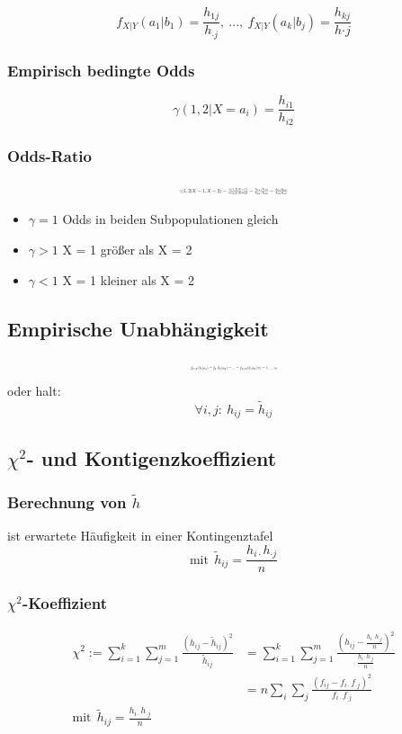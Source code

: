 \documentclass[10pt,a4paper,landscape]{article}
\begin{document}
\begin{multicols}{4}
\[
f_{X|Y}(a_1|b_1)=\frac{h_{1j}}{h_{\cdot j}},~...,~ f_{X|Y}(a_k|b_j)=\frac{h_{kj}}{h{\cdot j}}
\]

\subsubsection*{Empirisch bedingte Odds}

\[
\gamma (1,2|X=a_i)= \frac{h_{i1}}{h_{i2}}
\]

\subsubsection*{Odds-Ratio}

\[ \resizebox{0.25\textwidth}{!}{$
\gamma (1,2|X=1, X=2)=\frac{\gamma(1,2|X=1)}{\gamma(1,2|X=2)}=\frac{h_{11}/h_{12}}{h_{21}/h_{22}}=\frac{h_{11}h_{22}}{h_{21}h_{12}}
$}
\]

\begin{itemize}
\item $\gamma = 1$ Odds in beiden Subpopulationen gleich
\item $\gamma > 1$ X = 1 größer als X = 2
\item $\gamma < 1$ X = 1 kleiner als X = 2
\end{itemize}

\subsection{Empirische Unabhängigkeit}
\[ \resizebox{0.2\textwidth}{!}{$
f_{Y|X}(b_j|a_1)=f_Y(b_j|a_2)=...=f_{Y|X}(b_j|a_k)\forall j=1,...,m
$}
\]
oder halt:
\[
\forall i,j: ~ h_{ij}=\tilde{h}_{ij}
\]

\subsection{$\chi^2$- und Kontigenzkoeffizient}

\subsubsection*{Berechnung von $\tilde{h}$}
ist erwartete Häufigkeit in einer Kontingenztafel
\[
\text{mit}~~ \tilde{h}_{ij}=\frac{h_{i\cdot}h_{\cdot j}}{n}
\]

\subsubsection*{$\chi^2$-Koeffizient}

{\tiny
\begin{align*}
\chi^2 := \sum_{i=1}^k \sum_{j=1}^m \frac{(h_{ij}-\tilde{h}_{ij})^2}{\tilde{h}_{ij}}&=\sum_{i=1}^k \sum_{j=1}^m \frac{(h_{ij}-\frac{h_{i\cdot}h_{\cdot j}}{n})^2}{\frac{h_{i\cdot}h_{\cdot j}}{n}} \\
&=  n\sum_{i} \sum_{j}\frac{(f_{ij}-f_{i\cdot}f_{\cdot j})^2}{f_{i\cdot}f_{\cdot j}} \\
\text{mit}~~ \tilde{h}_{ij}=\frac{h_{i\cdot}h_{\cdot j}}{n}
\end{align*}
}


\end{multicols}
\end{document}
